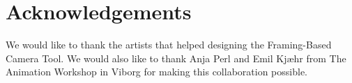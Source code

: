 \section{Acknowledgements}
We would like to thank the artists that helped designing the Framing-Based Camera Tool. We would also like to thank Anja Perl and Emil Kj\ae hr from The Animation Workshop in Viborg for making this collaboration possible.